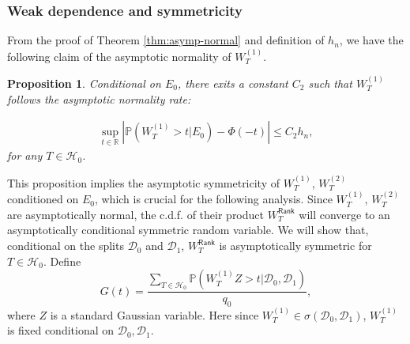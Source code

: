 \documentclass[12pt]{article}
\newcommand{\abs}[1]{\left\lvert#1\right\rvert}
\newcommand{\PP}{\mathbb{P}}
\newcommand{\R}{\mathbb{R}}
\newcommand{\cH}{\mathcal{H}}
\newcommand{\cD}{\mathcal{D}}
\def\PP{{\mathbb P}}
\theoremstyle{plain}
\newtheorem{Proposition}{Proposition}
\begin{document}
\subsubsection{Weak dependence and symmetricity}
From the proof of Theorem \ref{thm:asymp-normal} and definition of $h_n$, we have the following claim of the asymptotic normality of ${W}^{(1)}_{T}$.
\begin{Proposition}\label{prop:asy-w1}
Conditional on $E_0$, there exits a constant $C_2$ such that $W^{(1)}_T$ follows the asymptotic normality rate:

\begin{equation}\label{eq:asy-w1}
    \begin{aligned}
    \sup_{t\in\R}\abs{\PP(W^{(1)}_T>t|E_0 )-\Phi(-t)}\le C_2 h_n,
    \end{aligned}
\end{equation}
for any $T\in \cH_0$.
\end{Proposition}
This proposition implies the asymptotic symmetricity of ${W}^{(1)}_{T}$, ${W}^{(2)}_{T}$ conditioned on $E_0$, which is crucial for the following analysis. Since ${W}^{(1)}_{T}$, ${W}^{(2)}_{T}$ are asymptotically normal, the c.d.f. of their product $W_T^\mathsf{Rank}$ will converge to an asymptotically conditional symmetric random variable. We will show that, conditional on the splits $\cD_0$ and $\cD_1$, $W_T^\mathsf{Rank}$ is asymptotically symmetric for $T\in\cH_0$. Define 
\begin{equation*}
    G(t)= \frac{\sum_{T\in\cH_0 } \PP( {W}^{(1)}_{T} Z > t |\cD_0,\cD_1 )   }{q_0},
\end{equation*}
where $Z$ is a standard Gaussian variable. Here since ${W}^{(1)}_{T}\in\sigma(\cD_0,\cD_1)$, ${W}^{(1)}_{T}$ is fixed conditional on $\cD_0,\cD_1$.


\end{document}
